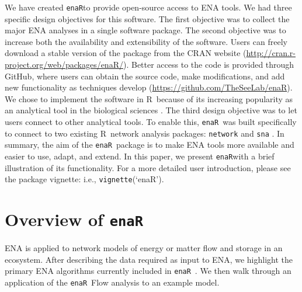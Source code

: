 \documentclass[11pt]{article}
\newcommand{\R}{R}
\newcommand{\enaR}{\texttt{enaR}}
\begin{document}
\begin{spacing}{2}
We have created \enaR to provide open-source access to ENA tools.  We
had three specific design objectives for this software.  The first
objective was to collect the major ENA analyses in a single software
package.  The second objective was to increase both the availability
and extensibility of the software.  Users can freely download a stable
version of the package from the CRAN website
(\url{http://cran.r-project.org/web/packages/enaR/}). Better access to
the code is provided through GitHub, where users can obtain the source
code, make modifications, and add new functionality as techniques
develop (\url{https://github.com/TheSeeLab/enaR}).  We chose
to implement the software in \R\ because of its increasing popularity
as an analytical tool in the biological sciences
\citep[e.g.,][]{dixon2003vegan, metcalf2012, revell2012phytools}. The
third design objective was to let users connect to other analytical
tools.  To enable this, \enaR\ was built specifically to connect to
two existing \R\ network analysis packages:  \texttt{network}
\citep{butts08_network} and \texttt{sna} \citep{butts08_social}.  In
summary, the aim of the \enaR\ package is to make ENA tools more
available and easier to use, adapt, and extend.  In this paper, we
present \enaR with a brief illustration of its functionality. For a
more detailed user introduction, please see the package vignette:
i.e., \texttt{vignette}(`enaR').

\section{Overview of \enaR}
ENA is applied to network models of energy or matter flow and storage
in an ecosystem.  After describing the data required as input to ENA,
we highlight the primary ENA algorithms currently included in \enaR\ .
We then walk through an application of the \enaR\ Flow analysis to an example
model.


\end{spacing}
\end{document}
